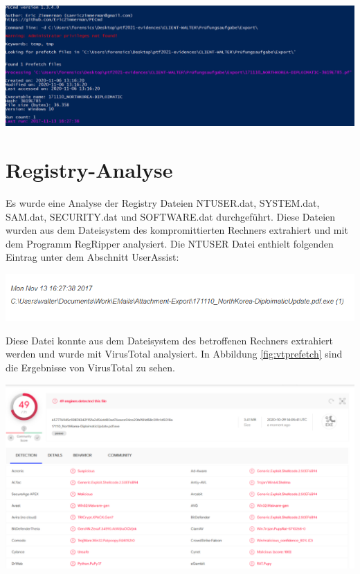\begin{center}
	\includegraphics[width=15.8cm]{figures/prefetch.png}
	\label{fig:prefetch}
\end{center}

\section{Registry-Analyse}
Es wurde eine Analyse der Registry Dateien NTUSER.dat, SYSTEM.dat, SAM.dat, SECURITY.dat und SOFTWARE.dat durchgeführt. Diese Dateien wurden aus dem Dateisystem des kompromittierten Rechners extrahiert und mit dem Programm RegRipper analysiert.
Die NTUSER Datei enthielt folgenden Eintrag unter dem Abschnitt UserAssist:
\\
\begin{center}
	\includegraphics[width=15.8cm]{figures/prefetch_path.png}
	\label{fig:prefetch_path}
\end{center}
\newpage
Diese Datei konnte aus dem Dateisystem des betroffenen Rechners extrahiert werden und wurde mit VirusTotal analysiert. In Abbildung \ref{fig:vtprefetch}  sind die Ergebnisse von VirusTotal zu sehen.

\begin{center}
	\includegraphics[width=15.8cm]{figures/virustotal_prefetch.png}
	\label{fig:vtprefetch}
\end{center}

